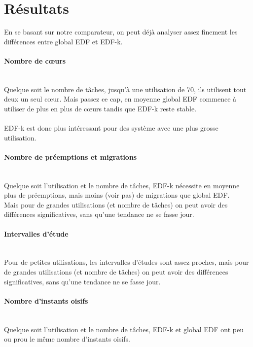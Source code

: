 \documentclass[a4paper,10pt]{article}
\begin{document}
\section{Résultats}

 	En se basant sur notre comparateur, on peut déjà analyser assez finement les différences entre global EDF et EDF-k.\\
	
	\paragraph*{Nombre de cœurs}~\\
		Quelque soit le nombre de tâches, jusqu'à une utilisation de 70, ils utilisent tout deux un seul cœur.
		Mais passez ce cap, en moyenne global EDF commence à utiliser de plus en plus de cœurs tandis que EDF-k reste stable.\\
		~\\
		EDF-k est donc plus intéressant pour des système avec une plus grosse utilisation.
		
	\paragraph*{Nombre de préemptions et migrations}~\\
		Quelque soit l'utilisation et le nombre de tâches, EDF-k nécessite en moyenne plus de préemptions, mais moins (voir pas) de migrations que global EDF.\\
		Mais pour de grandes utilisations (et nombre de tâches) on peut avoir des différences significatives, sans qu'une tendance ne se fasse jour.
		
	\paragraph*{Intervalles d'étude}~\\
		Pour de petites utilisations, les intervalles d'études sont assez proches, mais pour de grandes utilisations (et nombre de tâches) on peut avoir des différences significatives, sans qu'une tendance ne se fasse jour.
		
	\paragraph*{Nombre d'instants oisifs}~\\
		Quelque soit l'utilisation et le nombre de tâches, EDF-k et global EDF ont peu ou prou le même nombre d'instants oisifs.
		
\end{document}
